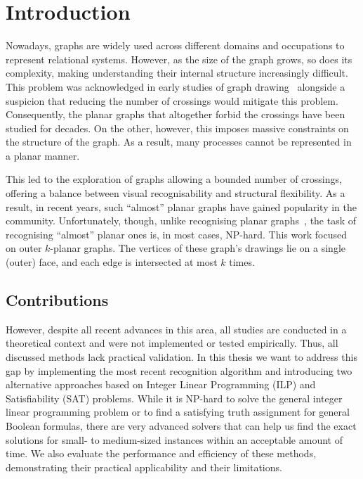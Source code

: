 \chapter{Introduction}\label{ch:introduction}

Nowadays, graphs are widely used across different domains and occupations to represent relational systems. However, as the size of the graph grows, so does its complexity, making understanding their internal structure increasingly difficult. This problem was acknowledged in early studies of graph drawing~\cite{early-few-crossing} alongside a suspicion that reducing the number of crossings would mitigate this problem. Consequently, the planar graphs that altogether forbid the crossings have been studied for decades. On the other, however, this imposes massive constraints on the structure of the graph. As a result, many processes cannot be represented in a planar manner.

This led to the exploration of graphs allowing a bounded number of crossings, offering a balance between visual recognisability and structural flexibility. As a result, in recent years, such ``almost'' planar graphs have gained popularity in the community. Unfortunately, though, unlike recognising planar graphs~\cite{linear-p}, the task of recognising ``almost'' planar ones is, in most cases, NP-hard. This work focused on outer \(k\)-planar graphs. The vertices of these graph's drawings lie on a single (outer) face, and each edge is intersected at most \(k\) times.

\section{Contributions}

However, despite all recent advances in this area, all studies are conducted in a theoretical context and were not implemented or tested empirically. Thus, all discussed methods lack practical validation. In this thesis we want to address this gap by implementing the most recent recognition algorithm and introducing two alternative approaches based on Integer Linear Programming (ILP) and Satisfiability (SAT) problems. While it is NP-hard to solve the general integer linear programming problem or to find a satisfying truth assignment for general Boolean formulas, there are very advanced solvers that can help us find the exact solutions for small- to medium-sized instances within an acceptable amount of time. We also evaluate the performance and efficiency of these methods, demonstrating their practical applicability and their limitations.


